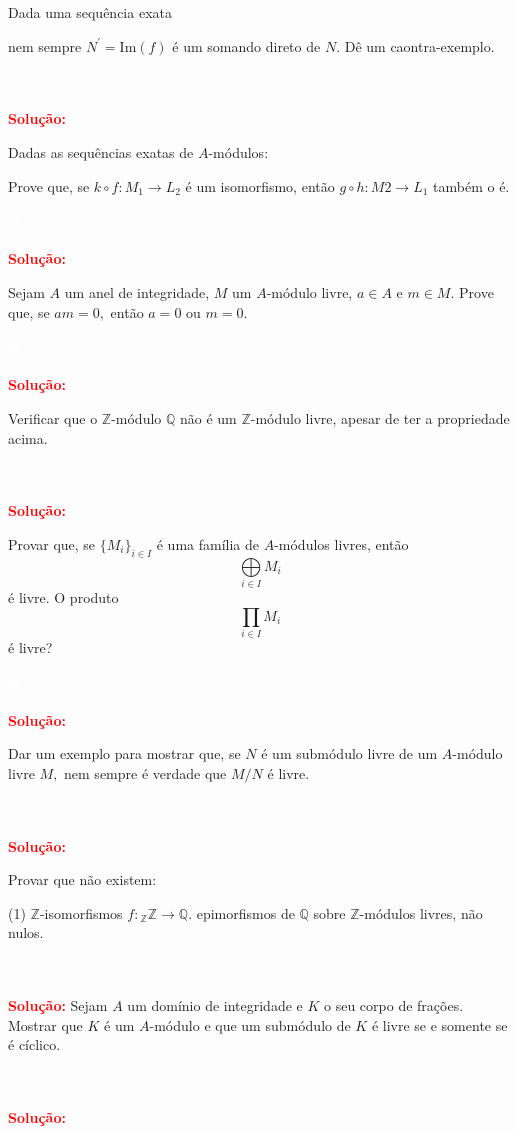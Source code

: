 \documentclass[11pt,a4paper]{article}
\newcounter{exercicio}[section]
\newcommand{\dividiritens}[1]{\begin{tasks}[counter-format={(tsk[a])},label-width=3.6ex, label-format = {\bfseries}, column-sep = {0pt}](1) #1 \end{tasks}}
\newcommand{\pers}[1]{\textcolor{Floresta}{$\negrito{(#1)} $}}
\newcommand{\solucao}[1]{
\textbf{\textcolor{white}{oi}\\ \\ \textcolor{red}{Solução:}} #1}
\begin{document}
 Dada uma sequência exata
\begin{center}
\end{center}
nem sempre $N^{\prime} = \mbox{Im}(f)$ é um somando direto de $N.$ Dê um caontra-exemplo.
\solucao{}

 Dadas as sequências exatas de $A$-módulos:
\begin{center}
\end{center}
Prove que, se $k \circ f\colon M_1 \to L_2$ é um isomorfismo, então $g \circ h \colon  M2 \to L_1$ também o é.
\solucao{}

 Sejam $A$ um anel de integridade, $M$ um $A$-módulo livre, $a \in A$ e $m \in M.$ Prove que, se $am = 0,$
então $a = 0$ ou $m = 0.$
\solucao{}

 Verificar que o $\mathbb{Z}$-módulo $\mathbb{Q}$ não é um $\mathbb{Z}$-módulo livre, apesar de ter a propriedade acima.
\solucao{}

 Provar que, se $\{M_i\}_{i\in I}$ é uma família de $A$-módulos livres, então 
\[\bigoplus\limits_{i \in I} M_i\]
é livre. O produto
\[\prod\limits_{i \in I} M_i\]
é livre?
\solucao{}

 Dar um exemplo para mostrar que, se $N$ é um submódulo livre de um $A$-módulo livre $M,$ nem sempre é verdade que $M/N$ é livre.
\solucao{}

 Provar que não existem:
\dividiritens{ 
\task[\pers{a}] $\mathbb{Z}$-isomorfismos $f \colon {}_\mathbb{Z}\mathbb{Z} \to \mathbb{Q}.$
\task[\pers{b}]  epimorfismos de $\mathbb{Q}$ sobre $\mathbb{Z}$-módulos livres, não nulos.
}
\solucao{}
 Sejam $A$ um domínio de integridade e $K$ o seu corpo de frações. Mostrar que $K$ é um $A$-módulo e que um submódulo de $K$ é livre se e somente se é cíclico.
\solucao{}
\end{document}
